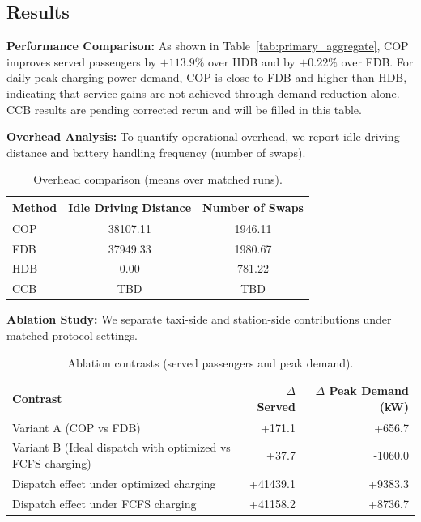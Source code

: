 \subsection{Results}
\textbf{Performance Comparison:}
As shown in Table~\ref{tab:primary_aggregate}, COP improves served passengers by $+113.9\%$ over HDB and by $+0.22\%$ over FDB.
For daily peak charging power demand, COP is close to FDB and higher than HDB, indicating that service gains are not achieved through demand reduction alone.
CCB results are pending corrected rerun and will be filled in this table.

\textbf{Overhead Analysis:}
To quantify operational overhead, we report idle driving distance and battery handling frequency (number of swaps).

\begin{table}[t]
\centering
\footnotesize
\setlength{\tabcolsep}{5pt}
\renewcommand{\arraystretch}{1.05}
\caption{Overhead comparison (means over matched runs).}
\label{tab:overhead}
\begin{tabular}{lcc}
\hline
Method & Idle Driving Distance & Number of Swaps \\
\hline
COP & 38107.11 & 1946.11 \\
FDB & 37949.33 & 1980.67 \\
HDB & 0.00 & 781.22 \\
CCB & TBD & TBD \\
\hline
\end{tabular}
\end{table}

\textbf{Ablation Study:}
We separate taxi-side and station-side contributions under matched protocol settings.

\begin{table}[t]
\centering
\footnotesize
\setlength{\tabcolsep}{4pt}
\renewcommand{\arraystretch}{1.05}
\caption{Ablation contrasts (served passengers and peak demand).}
\label{tab:ablation_contrast}
\begin{tabular}{lrr}
\hline
Contrast & $\Delta$ Served & $\Delta$ Peak Demand (kW) \\
\hline
Variant A (COP vs FDB) & +171.1 & +656.7 \\
Variant B (Ideal dispatch with optimized vs FCFS charging) & +37.7 & -1060.0 \\
Dispatch effect under optimized charging & +41439.1 & +9383.3 \\
Dispatch effect under FCFS charging & +41158.2 & +8736.7 \\
\hline
\end{tabular}
\end{table}

